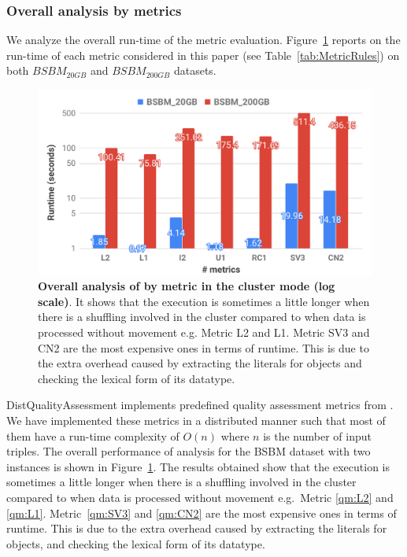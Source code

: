\subsubsection{Overall analysis by metrics}
We analyze the overall run-time of the metric evaluation.
Figure~\ref{fig:distqualityassessment-overall-analysis} reports on the run-time of each metric considered in this paper (see Table~\ref{tab:MetricRules}) on both $BSBM_{20GB}$ and $BSBM_{200GB}$ datasets.

\begin{figure}
\includegraphics[width=1.0\columnwidth]{images/5_distqualityassessment/distqualityassessment-overall-analysis.pdf}
\caption{\textbf{Overall analysis of by metric in the cluster mode (log scale)}.
It shows that the execution is sometimes a little longer when there is a shuffling involved in the cluster compared to when data is processed without movement e.g. Metric L2 and L1. 
Metric SV3 and CN2 are the most expensive ones in terms of runtime. This is due to the extra overhead caused by extracting the literals for objects and checking the lexical form of its datatype.
}
\label{fig:distqualityassessment-overall-analysis}
\end{figure}

DistQualityAssessment implements predefined quality assessment metrics from \cite{zaveri2015quality}. 
We have implemented these metrics in a distributed manner such that most of them have a run-time complexity of $O(n)$ where $n$ is the number of input triples.
The overall performance of analysis for the BSBM dataset with two instances is shown in Figure~\ref{fig:distqualityassessment-overall-analysis}.
The results obtained show that the execution is sometimes a little longer when there is a shuffling involved in the cluster compared to when data is processed without movement e.g.~Metric \ref{qm:L2} and \ref{qm:L1}.
Metric~\ref{qm:SV3} and \ref{qm:CN2} are the most expensive ones in terms of runtime.
This is due to the extra overhead caused by extracting the literals for objects, and checking the lexical form of its datatype. 

